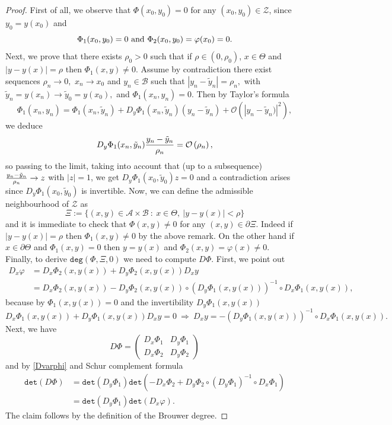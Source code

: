 \documentclass[11pt,a4paper]{amsart}
\theoremstyle{definition}
\renewcommand{\(}{\left(}
\renewcommand{\)}{\right)}
\begin{document}
\begin{proof}
First of all, we observe that $\Phi(x_0, y_0)=0$ for any $(x_0, y_0)\in \mathscr Z$, since $y_0=y(x_0)$ and
$$\Phi_1(x_0,y_0)=0\ \hbox{and}\ \Phi_2(x_0,y_0)=\varphi(x_0)=0.$$
Next,  we prove that
 there exists $\rho_0>0$ such that  if $\rho\in(0,\rho_0)$, $x\in \Theta$ and $|y-y(x)|=\rho$  then $\Phi_1(x,y)\not=0.$ 
 Assume by contradiction there exist sequences $\rho_n\to0,$ $x_n\to x_0$ and $y_n\in\mathcal B$ such that
 $ |y_n-\tilde y_n|=\rho_n,$ with $\tilde y_n=y(x_n)\to \tilde y_0=y(x_0) ,$ and  $\Phi_1(x_n,y_n)=0.$ Then by Taylor's formula
 $$\Phi_1(x_n,y_n)=\Phi_1(x_n,\tilde y_n)+D_y\Phi_1(x_n,\tilde y_n)(y_n-\tilde y_n)+\mathcal O\(|y_n-\tilde y_n)|^2\),$$
 we deduce
 $$D_y\Phi_1(x_n,\tilde y_n){y_n-\tilde y_n \over \rho_n}=\mathcal O\(\rho_n\),$$
so passing to the limit, taking into account that (up to a subsequence) ${y_n-\tilde y_n \over \rho_n}\to z$ with $|z|=1$, we get
 $D_y\Phi_1(x_0,\tilde y_0)z=0$ and  a contradiction arises since   $D_y\Phi_1(x_0,\tilde y_0)$ is invertible.
Now, we can define the admissible neighbourhood  of $\mathscr Z$ as
$$\Xi:=\{(x,y)\in\mathcal A\times\mathcal B\ :\ x\in \Theta,\ |y-y(x)|< \rho \}$$
and it is immediate to check that 
 $\Phi(x,y)\not=0$ for any $(x,y)\in\partial \Xi.$ Indeed if  $|y-y(x)|=\rho$ then   $\Phi_1(x,y)\not=0$ by the above remark. On the other hand if $x\in\partial \Theta$ and $\Phi_1(x,y)=0$ then $y=y(x)$ and $\Phi_2(x,y)=\varphi(x)\not=0.$
\\
Finally, to derive $\mathtt{deg}\left(\Phi, \Xi,0\right)$ we need to compute $D\Phi$. First, we point out 
\begin{equation}\label{Dvarphi}\begin{aligned}D_x\varphi&=D_x \Phi_2(x, y(x))+D_y\Phi_2(x, y(x))D_x y \\
&=D_x \Phi_2(x, y(x))-D_y\Phi_2(x, y(x))\circ\left(D_y \Phi_1(x, y(x))\right)^{-1}\circ D_x \Phi_1(x, y(x)),
\end{aligned}\end{equation}
because  by $\Phi_1(x, y(x))=0$  and the invertibility $D_y \Phi_1(x, y(x))$  
$$D_x \Phi_1(x, y(x)) +D_y \Phi_1(x, y(x)) D_x y=0\ \Rightarrow\ D_x y=-\left(D_y \Phi_1(x, y(x))\right)^{-1}\circ D_x \Phi_1(x, y(x)).$$ 
Next, we have
$$D\Phi=\left(\begin{matrix}  D_x \Phi_1& D_y \Phi_1 \\  D_x \Phi_2 & D_y \Phi_2 \end{matrix}\right)$$
and by \eqref{Dvarphi} and  Schur complement formula
$$\begin{aligned}\mathtt{det}(D\Phi)&=\mathtt{det}(D_y \Phi_1)\mathtt{det}\left(-D_x \Phi_2+D_y\Phi_2\circ \left(D_y \Phi_1\right)^{-1}\circ D_x \Phi_1\right)\\
&=\mathtt{det}(D_y \Phi_1)\mathtt{det}(D_x \varphi).\end{aligned}$$ 
The claim follows by the definition of  the Brouwer degree. 
\end{proof}
\end{document}
